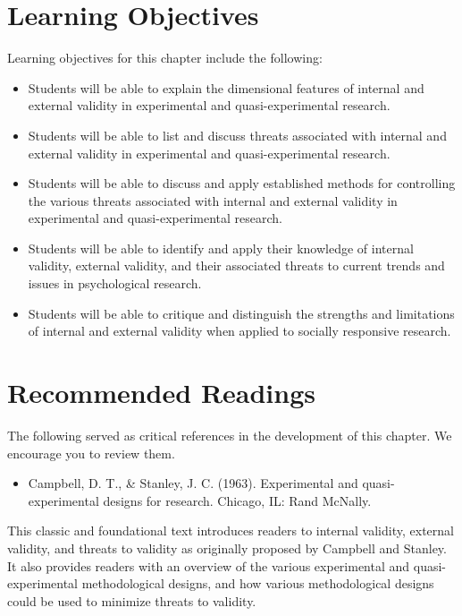 \documentclass[
  11pt,
]{book}
\providecommand{\tightlist}{%
  \setlength{\itemsep}{0pt}\setlength{\parskip}{0pt}}
\begin{document}
\hypertarget{learning-objectives}{%
\section{Learning Objectives}\label{learning-objectives}}

Learning objectives for this chapter include the following:

\begin{itemize}
\tightlist
\item
  Students will be able to explain the dimensional features of internal and external validity in experimental and quasi-experimental research.
\item
  Students will be able to list and discuss threats associated with internal and external validity in experimental and quasi-experimental research.
\item
  Students will be able to discuss and apply established methods for controlling the various threats associated with internal and external validity in experimental and quasi-experimental research.
\item
  Students will be able to identify and apply their knowledge of internal validity, external validity, and their associated threats to current trends and issues in psychological research.
\item
  Students will be able to critique and distinguish the strengths and limitations of internal and external validity when applied to socially responsive research.
\end{itemize}

\hypertarget{recommended-readings}{%
\section{Recommended Readings}\label{recommended-readings}}

The following served as critical references in the development of this chapter. We encourage you to review them.

\begin{itemize}
\tightlist
\item
  Campbell, D. T., \& Stanley, J. C. (1963). Experimental and quasi- experimental designs for research. Chicago, IL: Rand McNally.
\end{itemize}

This classic and foundational text introduces readers to internal validity, external validity, and threats to validity as originally proposed by Campbell and Stanley. It also provides readers with an overview of the various experimental and quasi-experimental methodological designs, and how various methodological designs could be used to minimize threats to validity.
\end{document}
